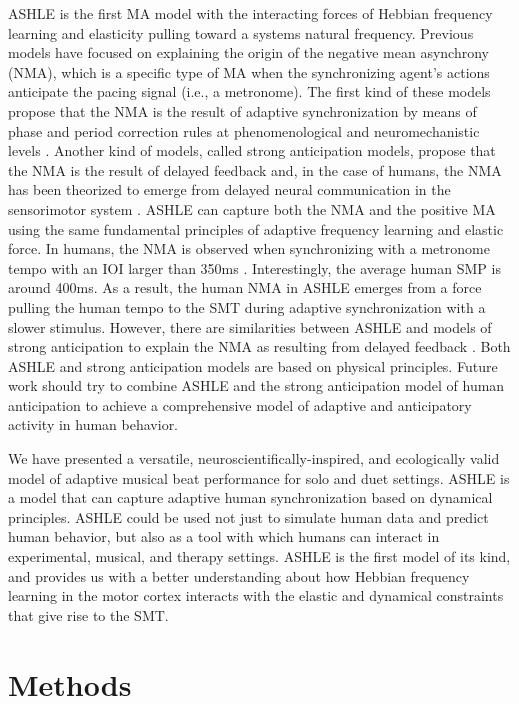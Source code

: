 \documentclass{report}
\begin{document}
ASHLE is the first MA model with the interacting forces of Hebbian frequency learning and elasticity pulling toward a systems natural frequency. Previous models have focused on explaining the origin of the negative mean asynchrony (NMA), which is a specific type of MA when the synchronizing agent's actions anticipate the pacing signal (i.e., a metronome). The first kind of these models propose that the NMA is the result of adaptive synchronization by means of phase and period correction rules at phenomenological \cite{van2013adaptation} and neuromechanistic levels \cite{bose2019neuromechanistic}. Another kind of models, called strong anticipation models, propose that the NMA is the result of delayed feedback \cite{stepp2010strong} and, in the case of humans, the NMA has been theorized to emerge from delayed neural communication in the sensorimotor system \cite{roman2019delayed}. ASHLE can capture both the NMA and the positive MA using the same fundamental principles of adaptive frequency learning and elastic force. In humans, the NMA is observed when synchronizing with a metronome tempo with an IOI larger than 350ms \cite{mates1994temporal}. Interestingly, the average human SMP is around 400ms. As a result, the human NMA in ASHLE emerges from a force pulling the human tempo to the SMT during adaptive synchronization with a slower stimulus. However, there are similarities between ASHLE and models of strong anticipation to explain the NMA as resulting from delayed feedback \cite{stepp2010strong, roman2019delayed}. Both ASHLE and strong anticipation models are based on physical principles. Future work should try to combine ASHLE and the strong anticipation model of human anticipation to achieve a comprehensive model of adaptive and anticipatory activity in human behavior.

We have presented a versatile, neuroscientifically-inspired, and ecologically valid model of adaptive musical beat performance for solo and duet settings. ASHLE is a model that can capture adaptive human synchronization based on dynamical principles. ASHLE could be used not just to simulate human data and predict human behavior, but also as a tool with which humans can interact in experimental, musical, and therapy settings. ASHLE is the first model of its kind, and provides us with a better understanding about how Hebbian frequency learning in the motor cortex interacts with the elastic and dynamical constraints that give rise to the SMT.

\section{Methods}
\end{document}
